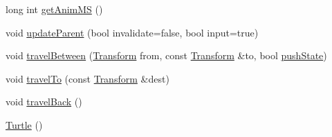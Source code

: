 \begin{DoxyCompactItemize}
long int \hyperlink{classcturtle_1_1Turtle_af567c8c2491fb8dca54d4725f2a6a7a8}{get\+Anim\+MS} ()
\item 
void \hyperlink{classcturtle_1_1Turtle_ada9ddbc87c2c9baaf2f1a1051acc3851}{update\+Parent} (bool invalidate=false, bool input=true)
\item 
void \hyperlink{classcturtle_1_1Turtle_a1fada959d0f1bd31b3854adea6d3d6de}{travel\+Between} (\hyperlink{classcturtle_1_1Transform}{Transform} from, const \hyperlink{classcturtle_1_1Transform}{Transform} \&to, bool \hyperlink{classcturtle_1_1Turtle_a5e602612caf63a1e2778b7c700cb7579}{push\+State})
\item 
void \hyperlink{classcturtle_1_1Turtle_af838da6166c05227dac1a8b57ca27414}{travel\+To} (const \hyperlink{classcturtle_1_1Transform}{Transform} \&dest)
\item 
void \hyperlink{classcturtle_1_1Turtle_a897a8629d80b75ab4c0e28c2728c8c9d}{travel\+Back} ()
\item 
\hyperlink{classcturtle_1_1Turtle_a09d00aef49f669e24cab5574f184e07a}{Turtle} ()
\end{DoxyCompactItemize}
